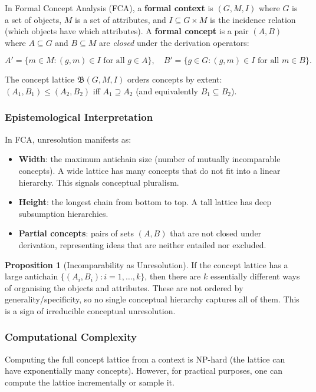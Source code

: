 \documentclass[11pt,letterpaper]{article}
\theoremstyle{definition}
\newtheorem{proposition}{Proposition}[section]
\theoremstyle{remark}
\begin{document}
In Formal Concept Analysis (FCA), a \textbf{formal context} is $(G, M, I)$ where $G$ is a set of objects, $M$ is a set of attributes, and $I \subseteq G \times M$ is the incidence relation (which objects have which attributes). A \textbf{formal concept} is a pair $(A, B)$ where $A \subseteq G$ and $B \subseteq M$ are \emph{closed} under the derivation operators:

\[
A' = \{m \in M : (g, m) \in I \text{ for all } g \in A\}, \quad B' = \{g \in G : (g, m) \in I \text{ for all } m \in B\}.
\]

The concept lattice $\mathfrak{B}(G, M, I)$ orders concepts by extent: $(A_1, B_1) \leq (A_2, B_2)$ iff $A_1 \supseteq A_2$ (and equivalently $B_1 \subseteq B_2$).

\subsubsection*{Epistemological Interpretation}

In FCA, unresolution manifests as:
\begin{itemize}
\item \textbf{Width}: the maximum antichain size (number of mutually incomparable concepts). A wide lattice has many concepts that do not fit into a linear hierarchy. This signals conceptual pluralism.
\item \textbf{Height}: the longest chain from bottom to top. A tall lattice has deep subsumption hierarchies.
\item \textbf{Partial concepts}: pairs of sets $(A, B)$ that are not closed under derivation, representing ideas that are neither entailed nor excluded.
\end{itemize}

\begin{proposition}[Incomparability as Unresolution]
If the concept lattice has a large antichain $\{(A_i, B_i) : i = 1, \ldots, k\}$, then there are $k$ essentially different ways of organising the objects and attributes. These are not ordered by generality/specificity, so no single conceptual hierarchy captures all of them. This is a sign of irreducible conceptual unresolution.
\end{proposition}

\subsubsection*{Computational Complexity}

Computing the full concept lattice from a context is NP-hard (the lattice can have exponentially many concepts). However, for practical purposes, one can compute the lattice incrementally or sample it.
\end{document}
